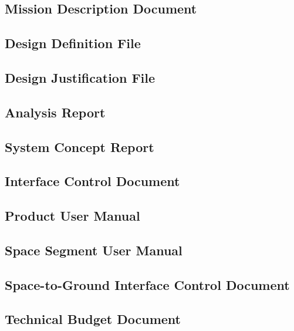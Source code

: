 \subsection{Mission Description Document}
\label{sec:Mission Description Document}


\subsection{Design Definition File}
\label{sec:Design Definition File}


\subsection{Design Justification File}
\label{sec:Design Justification File}


\subsection{Analysis Report}
\label{sec:Analysis Report}


\subsection{System Concept Report}
\label{sec:System Concept Report}


\subsection{Interface Control Document}
\label{sec:Interface Control Document}


\subsection{Product User Manual}
\label{sec:Product User Manual}


\subsection{Space Segment User Manual}
\label{sec:Space Segment User Manual}


\subsection{Space-to-Ground Interface Control Document}
\label{sec:Space-to-Ground Interface Control Document}


\subsection{Technical Budget Document}
\label{sec:Technical Budget Document}


